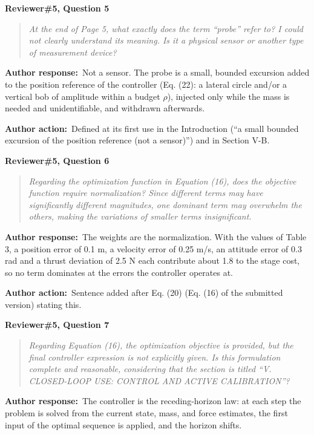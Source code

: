\documentclass[11pt]{article}
\newcommand{\concern}[1]{\par\medskip\noindent\colorbox{gray!12}{\parbox{\dimexpr\linewidth-2\fboxsep}{\textbf{#1}}}\par\smallskip}
\newcommand{\rlabel}[1]{\par\textbf{#1}\ }
\begin{document}
\concern{Reviewer\#5, Question 5}

\begin{quote}\itshape At the end of Page 5, what exactly does the term ``probe'' refer to? I could not clearly understand its meaning. Is it a physical sensor or another type of measurement device?\end{quote}

\rlabel{Author response:}Not a sensor. The probe is a small, bounded excursion added to the position reference of the controller (Eq. (22): a lateral circle and/or a vertical bob of amplitude within a budget $\rho$), injected only while the mass is needed and unidentifiable, and withdrawn afterwards.

\rlabel{Author action:}Defined at its first use in the Introduction (``a small bounded excursion of the position reference (not a sensor)'') and in Section V-B.

\concern{Reviewer\#5, Question 6}

\begin{quote}\itshape Regarding the optimization function in Equation (16), does the objective function require normalization? Since different terms may have significantly different magnitudes, one dominant term may overwhelm the others, making the variations of smaller terms insignificant.\end{quote}

\rlabel{Author response:}The weights are the normalization. With the values of Table 3, a position error of 0.1 m, a velocity error of 0.25 m/s, an attitude error of 0.3 rad and a thrust deviation of 2.5 N each contribute about 1.8 to the stage cost, so no term dominates at the errors the controller operates at.

\rlabel{Author action:}Sentence added after Eq. (20) (Eq. (16) of the submitted version) stating this.

\concern{Reviewer\#5, Question 7}

\begin{quote}\itshape Regarding Equation (16), the optimization objective is provided, but the final controller expression is not explicitly given. Is this formulation complete and reasonable, considering that the section is titled ``V. CLOSED-LOOP USE: CONTROL AND ACTIVE CALIBRATION''?\end{quote}

\rlabel{Author response:}The controller is the receding-horizon law: at each step the problem is solved from the current state, mass, and force estimates, the first input of the optimal sequence is applied, and the horizon shifts.
\end{document}
